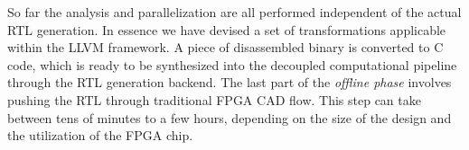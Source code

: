 So far the analysis and parallelization are all performed independent of the actual
RTL generation. In essence we have devised a set of transformations applicable within the LLVM framework. A piece of disassembled binary is converted to C code, which is ready to be synthesized into the decoupled computational pipeline through the RTL generation backend. The last part of the \textit{offline phase} involves pushing the RTL through traditional FPGA CAD flow. This step can take between tens of minutes to a few hours,
depending on the size of the design and the utilization of the FPGA chip. 


